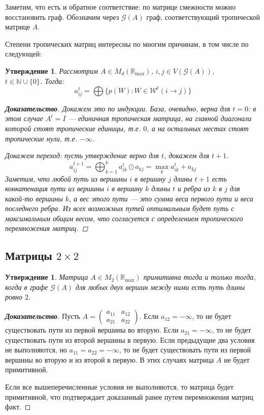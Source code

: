 \documentclass[12pt]{article}
\newtheorem{proposition}[theorem]{Утверждение}
\begin{document}
Заметим, что есть и обратное соответствие: по матрице смежности можно восстановить граф. Обозначим через $\mathcal{G}(A)$ граф, соответствующий тропической матрице $A$.

Степени тропических матриц интересны по многим причинам, в том числе по следующей:
\begin{proposition}
\label{proposition:entriesInTropicalPower}
Рассмотрим $A \in M_d(\mathbb{R}_{\max})$, $i, j \in V(\mathcal{G}(A))$, \\$t \in \mathbb{N} \cup \{0\}$. Тогда:
\begin{equation*}
    a_{ij}^t = \bigoplus \{p(W): W \in \mathcal{W}^t(i \rightarrow j)\}
\end{equation*}
\begin{proof}[\textbf{Доказательство}]
Докажем это по индукции. База, очевидно, верна для $t = 0$: в этом случае $A^t = I$ --- единичная тропическая матрица, на главной диагонали которой стоят тропические единицы, т.е. $0$, а на остальных местах стоят тропические нули, т.е. $-\infty$.

Докажем переход: пусть утверждение верно для $t$, докажем для $t + 1$.
\begin{equation*}
    a_{ij}^{t + 1} = \bigoplus_{k = 1}^{k} a_{ik}^t \odot a_{kj} = \max_k a_{ik}^t + a_{kj}
\end{equation*}
Заметим, что любой путь из вершины $i$ в вершину $j$ длины $t + 1$ есть конкатенация пути из вершины $i$ в вершину $k$ длины $t$ и ребра из $k$ в $j$ для какой-то вершины $k$, а вес этого пути --- это сумма веса первого пути и веса последнего ребра. Из всех возможных путей оптимальным будет путь с максимальным общим весом, что согласуется с определением тропического перемножения матриц.
\end{proof}
\end{proposition}

\subsection{Матрицы $2\times2$}
\begin{proposition}
Матрица $A \in M_2(\mathbb{R}_{\max})$ примитивна тогда и только тогда, когда в графе $\mathcal{G}(A)$ для любых двух вершин между ними есть путь длины ровно $2$.
\end{proposition}
\begin{proof}[\textbf{Доказательство}]
Пусть $A = \begin{pmatrix}
a_{11} & a_{12} \\
a_{21} & a_{22}
\end{pmatrix}$. Если $a_{12} = -\infty$, то не будет существовать пути из первой вершины во вторую. Если $a_{21} = -\infty$, то не будет существовать пути из второй вершины в первую. Если предыдущие два условия не выполняются, но $a_{11} = a_{22} = -\infty$, то не будет существовать пути из первой вершины во вторую и из второй в первую. В этих случаях матрица $A$ не будет примитивной.

Если все вышеперечисленные условия не выполняются, то матрица будет примитивной, что подтверждает доказанный ранее путем перемножения матриц факт.
\end{proof}
\end{document}

